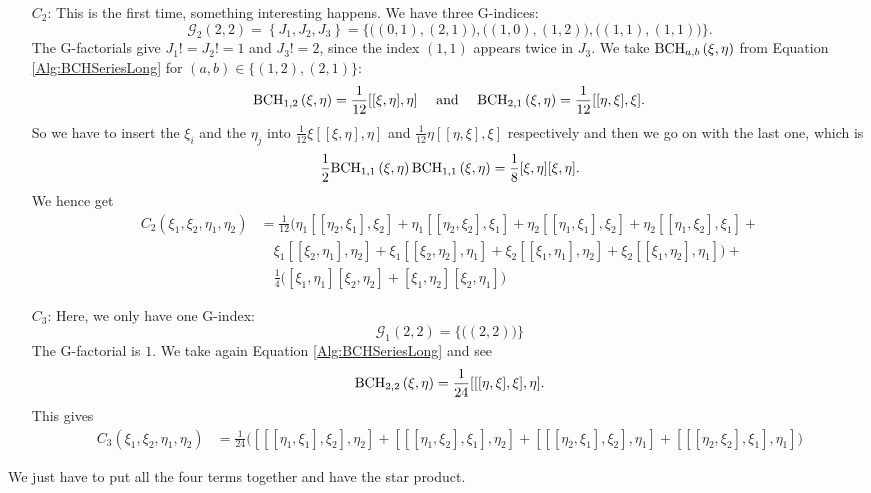 \begin{itemize}
	\item[$C_2$:]
	This is the first time, something interesting happens. We have three 
	G-indices:
	\begin{equation*}
		\mathcal{G}_2(2,2) 
		=
		\left\{ J_1, J_2, J_3 \right\}
		= 
		\big\{ 
			\big((0,1), (2,1)\big), 
			\big((1,0), (1,2)\big), 
			\big((1,1), (1,1)\big) 
		\big\}.
	\end{equation*}
	The G-factorials give $J_1! = J_2! = 1$ and $J_3! = 2$, since the index 
	$(1,1)$ appears twice in $J_3$. We take $\mathrm{BCH}_{a, b}\left(\xi, \eta\right)$ 
	from Equation \eqref{Alg:BCHSeriesLong} for $(a,b) \in \{(1,2), (2,1)\}$:
	\begin{equation*}
		\mathrm{BCH}_{1, 2}\left(\xi, \eta\right)
		=
		\frac{1}{12}[[\xi, \eta], \eta]
		\quad \text{ and } \quad
		\mathrm{BCH}_{2, 1}\left(\xi, \eta\right)
		=
		\frac{1}{12}[[\eta, \xi], \xi].
	\end{equation*}
	So we have to insert the $\xi_i$ and the $\eta_j$ into $\frac{1}{12} 
	\xi [[\xi, \eta], \eta]$ and $\frac{1}{12} \eta [[\eta, \xi], \xi]$ 
	respectively and then we go on with the last one, which is
	\begin{equation*}
		\frac{1}{2}
		\mathrm{BCH}_{1, 1}\left(\xi, \eta\right)
		\mathrm{BCH}_{1, 1}\left(\xi, \eta\right)
		=
		\frac{1}{8}
		[\xi, \eta][\xi, \eta].
	\end{equation*}
	We hence get
	\begin{align*}
		C_2(\xi_1, \xi_2, \eta_1, \eta_2) 
		& = 
		\frac{1}{12}
		\big( 
			\eta_1 [[\eta_2, \xi_1],\xi_2] + 
			\eta_1 [[\eta_2, \xi_2],\xi_1] + 
			\eta_2 [[\eta_1, \xi_1],\xi_2] + 
			\eta_2 [[\eta_1, \xi_2],\xi_1] +
		\\
		& \quad
			\xi_1 [[\xi_2, \eta_1],\eta_2] + 
			\xi_1 [[\xi_2, \eta_2],\eta_1] + 
			\xi_2 [[\xi_1, \eta_1],\eta_2] + 
			\xi_2 [[\xi_1, \eta_2],\eta_1] 
 		\big) +
 		\\
 		& \quad
		\frac{1}{4} 
		\big( 
			[\xi_1,\eta_1][\xi_2,\eta_2] + 
			[\xi_1,\eta_2][\xi_2,\eta_1] 
		\big)
	\end{align*}
	
	\item[$C_3$:]
	Here, we only have one G-index:
	\begin{equation*}
		\mathcal{G}_1(2,2) 
		=
		\big\{ 
			\big( (2,2) \big) 
		\big\}
	\end{equation*}
	The G-factorial is $1$. We take again Equation \eqref{Alg:BCHSeriesLong} 
	and see
	\begin{equation*}
		\mathrm{BCH}_{2, 2}\left(\xi, \eta\right)
		=
		\frac{1}{24}
		[[[\eta, \xi], \xi], \eta].
	\end{equation*}
	This gives
	\begin{align*}
		C_3(\xi_1, \xi_2, \eta_1, \eta_2) 
		& = 
		\frac{1}{24}
		\big( 
			[[[\eta_1,\xi_1],\xi_2],\eta_2] + 
			[[[\eta_1,\xi_2],\xi_1],\eta_2] +
			[[[\eta_2,\xi_1],\xi_2],\eta_1] + 
			[[[\eta_2,\xi_2],\xi_1],\eta_1] 
		\big)
	\end{align*}
\end{itemize}
We just have to put all the four terms together and have the star product.


